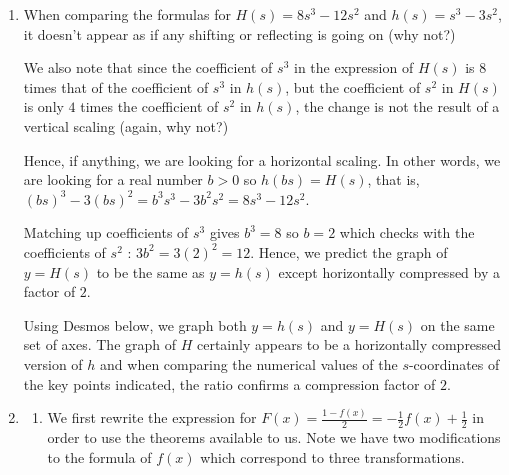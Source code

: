 \documentclass{ximera}
\begin{document}
\begin{example}
\begin{enumerate}
Using the Desmos interactive below, adjusting the slider for $t$ traces corresponding points on both $y = g(t)$ and
$y = G(t)$.  Dividing the $y$-coordinates on the graph of $y = G(t)$ by the $y$-coordinates of the corresponding points on the graph of $y=g(t)$ confirms a vertical scaling factor of $4$.


\begin{center}
\end{center}
 
   
 \item  When comparing the formulas for $H(s) = 8s^3 - 12s^2$ and $h(s) = s^3-3s^2$, it doesn't appear as if any shifting or reflecting is going on (why not?)   
 
 We also note that since the coefficient of $s^3$ in the expression of $H(s)$ is $8$ times that of the coefficient of $s^3$ in $h(s)$, but the coefficient of $s^2$ in $H(s)$ is only $4$ times the coefficient of $s^2$ in $h(s)$, the change is not the result of a vertical scaling (again, why not?)  
 
 Hence, if anything, we are looking for a horizontal scaling.  In other words, we are looking for a real number $b>0$ so $h(bs) = H(s)$, that is, $(bs)^3 - 3 (bs)^2 = b^3 s^3 - 3b^2 s^2 = 8s^3-12s^2$.  
 
 Matching  up coefficients of $s^3$ gives $b^3=8$ so $b=2$ which checks with the coefficients of $s^2$ : $3b^2 = 3(2)^2 = 12$. Hence, we predict the graph of $y=H(s)$ to be the same as $y=h(s)$ except horizontally compressed by a factor of $2$.  
 
 Using Desmos below, we graph both $y=h(s)$ and $y=H(s)$ on the same set of axes.  The graph of $H$ certainly appears to be a horizontally compressed version of $h$ and when comparing the numerical values of the $s$-coordinates of the key points indicated, the ratio confirms a compression factor of $2$.
 

 \begin{center}
 \end{center}
 
\item  

 
 \begin{enumerate}
 
 \item We first rewrite the expression for $F(x) = \frac{1-f(x)}{2} = -\frac{1}{2}f(x) + \frac{1}{2}$ in order to use the theorems available to us.  Note we have two modifications to the formula of $f(x)$ which correspond to three transformations.  
 

\end{enumerate}
\end{enumerate}
\end{example}
\end{document}
